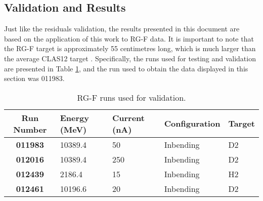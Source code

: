 \subsection{Validation and Results}
\label{12.40::validation_and_results}
    Just like the residuals validation, the results presented in this document are based on the application of this work to RG-F data.
    It is important to note that the RG-F target is approximately 55 centimetres long, which is much larger than the average CLAS12 target \cite{hattawy2019}.
    Specifically, the runs used for testing and validation are presented in Table \ref{tab::12.40::rgf_data}, and the run used to obtain the data displayed in this section was 011983.

    \begin{table}[h!]
        \centering
        \begin{tabular}{c|llll}
            \textbf{Run Number} & \textbf{Energy (MeV)} & \textbf{Current (nA)} & \textbf{Configuration} & \textbf{Target} \\
            \hline
            \textbf{011983}     & 10389.4 &  50 & Inbending & D2 \\
            \textbf{012016}     & 10389.4 & 250 & Inbending & D2 \\
            \textbf{012439}     &  2186.4 &  15 & Inbending & H2 \\
            \textbf{012461}     & 10196.6 &  20 & Inbending & D2
        \end{tabular}
        \caption{RG-F runs used for validation.}
        \label{tab::12.40::rgf_data}
    \end{table}

    
    
    
    
